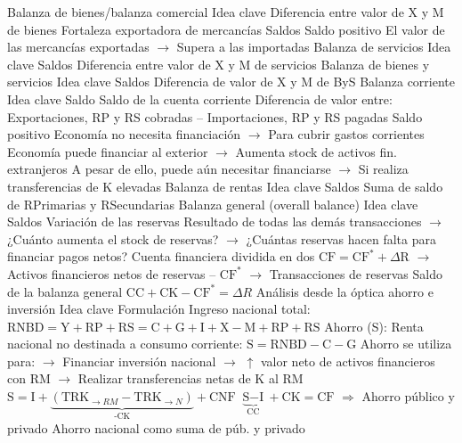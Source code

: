 \documentclass{nuevotema}
\begin{document}
\begin{esquemal}
		\2 Balanza de bienes/balanza comercial
			\3 Idea clave
				\4 Diferencia entre valor de X y M de bienes
				\4 Fortaleza exportadora de mercancías
			\3 Saldos
				\4 Saldo positivo
				\4[] El valor de las mercancías exportadas
				\4[] $\to$ Supera a las importadas
		\2 Balanza de servicios
			\3 Idea clave
			\3 Saldos
				\4 Diferencia entre valor de X y M de servicios
		\2 Balanza de bienes y servicios
			\3 Idea clave
			\3 Saldos
				\4 Diferencia de valor de X y M de ByS
		\2 Balanza corriente
			\3 Idea clave
			\3 Saldo
				\4 Saldo de la cuenta corriente
				\4 Diferencia de valor entre:
				\4[] Exportaciones, RP y RS cobradas
				\4[] -- Importaciones, RP y RS pagadas
				\4 Saldo positivo
				\4[] Economía no necesita financiación
				\4[] $\to$ Para cubrir gastos corrientes
				\4[] Economía puede financiar al exterior
				\4[] $\to$ Aumenta stock de activos fin. extranjeros
				\4[] A pesar de ello, puede aún necesitar financiarse
				\4[] $\to$ Si realiza transferencias de K elevadas
		\2 Balanza de rentas
			\3 Idea clave
			\3 Saldos
				\4 Suma de saldo de RPrimarias y RSecundarias
		\2 Balanza general (overall balance)
			\3 Idea clave
			\3 Saldos
				\4 Variación de las reservas
				\4[] Resultado de todas las demás transacciones
				\4[] $\to$ ¿Cuánto aumenta el stock de reservas?
				\4[] $\to$ ¿Cuántas reservas hacen falta para financiar pagos netos?
				\4 Cuenta financiera dividida en dos
				\4[] $\text{CF} = \text{CF}^* + \Delta \text{R}$
				\4[] $\to$ Activos financieros netos de reservas -- $\text{CF}^*$
				\4[] $\to$ Transacciones de reservas
				\4 Saldo de la balanza general
				\4[] $\text{CC} + \text{CK} - \text{CF}^* = \Delta {R}$
		\2 Análisis desde la óptica ahorro e inversión
			\3 Idea clave
			\3 Formulación
				\4 Ingreso nacional total:
				\4[] $\text{RNBD} = \text{Y} + \text{RP} + \text{RS} = \text{C}+\text{G}+\text{I} + \text{X} - \text{M} + \text{RP}+\text{RS}$
				\4 Ahorro (S):
				\4[] Renta nacional no destinada a consumo corriente:
				\4[] $\text{S} = \text{RNBD} - \text{C} - \text{G}$
				\4 Ahorro se utiliza para:
				\4[] $\to$ Financiar inversión nacional
				\4[] $\to$ $\uparrow$ valor neto de activos financieros con RM
				\4[] $\to$ Realizar transferencias netas de K al RM
				\4[] $\text{S}=\text{I} + \underbrace{(\text{TRK}_{\to RM} - \text{TRK}_{\to N})}_{\text{-CK}} + \text{CNF}$
				\4[] $\underbrace{\text{S}-\text{I}}_{\text{CC}}+ \text{CK} = \text{CF}$
				\4[] $\Rightarrow$ 
				\4 Ahorro público y privado
				\4[] Ahorro nacional como suma de púb. y privado

\end{esquemal}
\end{document}
